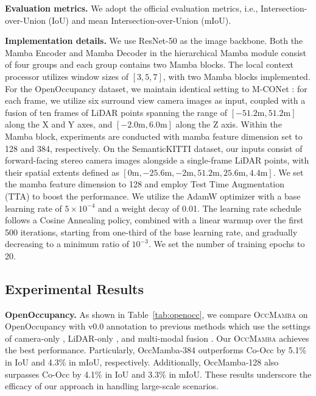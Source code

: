 \documentclass[10pt,twocolumn,letterpaper]{article}
\newcommand{\methodname}{\textsc{OccMamba}}
\begin{document}
\textbf{Evaluation metrics.}
We adopt the official evaluation metrics, i.e., Intersection-over-Union (IoU) and mean Intersection-over-Union (mIoU).

\textbf{Implementation details.}
We use ResNet-50 \cite{tridao} as the image backbone. Both the Mamba Encoder and Mamba Decoder in the hierarchical Mamba module consist of four groups and each group contains two Mamba blocks. The local context processor utilizes window sizes of $[3, 5, 7]$, with two Mamba blocks implemented. For the OpenOccupancy dataset, we maintain identical setting to M-CONet \cite{luisroldao}: for each frame, we utilize six surround view camera images as input, coupled with a fusion of ten frames of LiDAR points spanning the range of $[-51.2\text{m}, 51.2\text{m}]$ along the X and Y axes, and $[-2.0\text{m}, 6.0\text{m}]$ along the Z axis. Within the Mamba block, experiments are conducted with mamba feature dimension set to 128 and 384, respectively. On the SemanticKITTI dataset, our inputs consist of forward-facing stereo camera images alongside a single-frame LiDAR points, with their spatial extents defined as $[0\text{m}, -25.6\text{m}, -2\text{m}, 51.2\text{m}, 25.6\text{m}, 4.4\text{m}]$. We set the mamba feature dimension to 128 and employ Test Time Augmentation (TTA) to boost the performance. We utilize the AdamW optimizer with a base learning rate of $5 \times 10^{-4}$ and a weight decay of 0.01. The learning rate schedule follows a Cosine Annealing policy, combined with a linear warmup over the first 500 iterations, starting from one-third of the base learning rate, and gradually decreasing to a minimum ratio of $10^{-3}$. We set the number of training epochs to 20.

\subsection{Experimental Results}

\textbf{OpenOccupancy.}
As shown in Table~\ref{tab:openocc}, we compare \methodname{} on OpenOccupancy with v0.0 annotation to previous methods which use the settings of camera-only \cite{maximberman2020,holgercaesar,martingarbade,dingkangliang2019}, LiDAR-only \cite{haiyangwang2022,shuransong2021}, and multi-modal fusion \cite{jianbiaomei,luisroldao}. Our \methodname{} achieves the best performance. Particularly, OccMamba-384 outperforms Co-Occ \cite{jianbiaomei} by 5.1\% in IoU and 4.3\% in mIoU, respectively. Additionally, OccMamba-128 also surpasses Co-Occ by 4.1\% in IoU and 3.3\% in mIoU. These results underscore the efficacy of our approach in handling large-scale scenarios.
\end{document}

